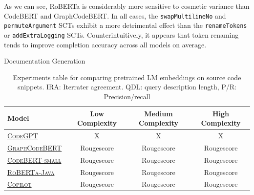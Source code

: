 \documentclass[sigconf,review,anonymous]{acmart}
\begin{document}
  As we can see, RoBERTa is considerably more sensitive to cosmetic variance than CodeBERT and GraphCodeBERT. In all cases, the  \lstinline|swapMultilineNo| and \lstinline|permuteArgument| SCTs exhibit a more detrimental effect than the \lstinline|renameTokens| or \lstinline|addExtraLogging| SCTs. Counterintuitively, it appears that token renaming tends to improve completion accuracy across all models on average.


  

  Documentation Generation
    {
    \renewcommand{\arraystretch}{1.5}
    \begin{table}[H]
      \footnotesize
      \begin{tabular}{l|ccc}
        Model & Low Complexity & Medium Complexity & High Complexity \\
        \hline
        \href{https://huggingface.co/microsoft/CodeGPT-small-java}{\textsc{CodeGPT}}~\citep{lu2021codexglue} & X & X & X \\
        \href{https://huggingface.co/microsoft/graphcodebert-base}{\textsc{GraphCodeBERT}}~\citep{guo2021graphcodebert} & Rougescore & Rougescore & Rougescore \\
        \href{https://huggingface.co/huggingface/CodeBERTa-small-v1a}{\textsc{CodeBERT-small}}~\citep{feng2020codebert} & Rougescore & Rougescore & Rougescore \\
        \href{https://huggingface.co/dbernsohn/roberta-java}{\textsc{RoBERTa-Java}}~\citep{liu2019roberta} & Rougescore & Rougescore & Rougescore \\
        \href{https://copilot.github.com/}{\textsc{Copilot}}\citep{chen2021evaluating} & Rougescore & Rougescore & Rougescore \\

      \end{tabular}
      \caption{\label{tab:doc_synthesis} Experiments table for comparing pretrained LM embeddings on source code snippets. IRA: Iterrater agreement. QDL: query description length, P/R: Precision/recall}
    \end{table}
  }
\end{document}
